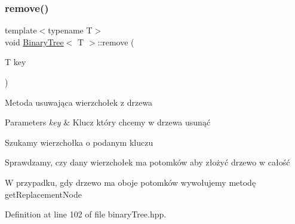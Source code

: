 \subsubsection{\texorpdfstring{remove()}{remove()}}
{\footnotesize\ttfamily template$<$typename T$>$ \\
void \hyperlink{classBinaryTree}{Binary\+Tree}$<$ T $>$\+::remove (\begin{DoxyParamCaption}\item[{T}]{key }\end{DoxyParamCaption})\hspace{0.3cm}{\ttfamily [inline]}}

Metoda usuwająca wierzchołek z drzewa 
\begin{DoxyParams}{Parameters}
{\em key} & Klucz który chcemy w drzewa usunąć \\
\hline
\end{DoxyParams}
Szukamy wierzchołka o podanym kluczu

Sprawdzamy, czy dany wierzchołek ma potomków aby złożyć drzewo w całość

W przypadku, gdy drzewo ma oboje potomków wywołujemy metodę get\+Replacement\+Node 

Definition at line 102 of file binary\+Tree.\+hpp.


